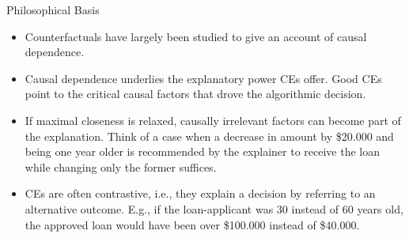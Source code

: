 \documentclass[11pt,compress,t,notes=noshow, xcolor=table]{beamer}
\begin{document}
\begin{vbframe}{Philosophical Basis}
	\begin{itemize}
	\item Counterfactuals have largely been studied to give an account of causal dependence.
		\item Causal dependence underlies the explanatory power CEs offer. Good CEs point to the critical causal factors that drove the algorithmic decision.
		\item If maximal closeness is relaxed, causally irrelevant factors can become part of the explanation. Think of a case when a decrease in amount by \$20.000 and being one year older is recommended by the explainer to receive the loan while changing only the former suffices.
		\item CEs are often contrastive, i.e., they explain a decision by referring to an alternative outcome. E.g., if the loan-applicant was 30 instead of 60 years old, the approved loan would have been over \$100.000 instead of \$40.000.%
	\end{itemize}
\end{vbframe}

\end{document}
